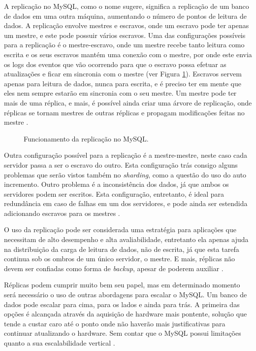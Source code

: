 \documentclass[diss]{template/setrem}
\begin{document}
A replicação no MySQL, como o nome sugere, significa a replicação de um banco de dados em uma outra máquina, aumentando o número de pontos de leitura de dados. A replicação envolve mestres e escravos, onde um escravo pode ter apenas um mestre, e este pode possuir vários escravos. Uma das configurações possíveis para a replicação é o mestre-escravo, onde um mestre recebe tanto leitura como escrita e os seus escravos mantém uma conexão com o mestre, por onde este envia os logs dos eventos que vão ocorrendo para que o escravo possa efetuar as atualizações e ficar em sincronia com o mestre (ver Figura \ref{fig:mysql-replication}). Escravos servem apenas para leitura de dados, nunca para escrita, e é preciso ter em mente que eles nem sempre estarão em sincronia com o seu mestre. Um mestre pode ter mais de uma réplica, e mais, é possível ainda criar uma árvore de replicação, onde réplicas se tornam mestres de outras réplicas e propagam modificações feitas no mestre \citep{Henderson2006}.

\begin{figure}[!h]
    \caption{Funcionamento da replicação no MySQL.}
    \label{fig:mysql-replication}
\end{figure}

Outra configuração possível para a replicação é a mestre-mestre, neste caso cada servidor passa a ser o escravo do outro. Esta configuração trás consigo alguns problemas que serão vistos também no \emph{sharding}, como a questão do uso do auto incremento. Outro problema é a inconsistência dos dados, já que ambos os servidores podem ser escritos. Esta configuração, entretanto, é ideal para redundância em caso de falhas em um dos servidores, e pode ainda ser estendida adicionando escravos para os mestres \citep{Henderson2006}.

O uso da replicação pode ser considerada uma estratégia para aplicações que necessitam de alto desempenho e alta avaliabilidade, entretanto ela apenas ajuda na distribuição da carga de leitura de dados, não de escrita, já que esta tarefa continua sob os ombros de um único servidor, o mestre. E mais, réplicas não devem ser confiadas como forma de \emph{backup}, apesar de poderem auxiliar \citep{Schwartz2008}.

Réplicas podem cumprir muito bem seu papel, mas em determinado momento será necessário o uso de outras abordagens para escalar o MySQL. Um banco de dados pode escalar para cima, para os lados e ainda para trás. A primeira das opções é alcançada através da aquisição de hardware mais pontente, solução que tende a custar caro até o ponto onde não haverão mais justificativas para continuar atualizando o hardware. Sem contar que o MySQL possui limitações quanto a sua escalabilidade vertical \citep{Schwartz2008}.
\end{document}
